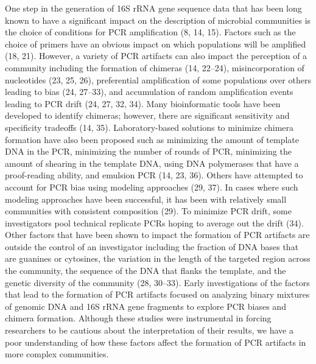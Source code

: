 \documentclass[11pt,]{article}
\begin{document}
One step in the generation of 16S rRNA gene sequence data that has been
long known to have a significant impact on the description of microbial
communities is the choice of conditions for PCR amplification (8, 14,
15). Factors such as the choice of primers have an obvious impact on
which populations will be amplified (18, 21). However, a variety of PCR
artifacts can also impact the perception of a community including the
formation of chimeras (14, 22--24), misincorporation of nucleotides (23,
25, 26), preferential amplification of some populations over others
leading to bias (24, 27--33), and accumulation of random amplification
events leading to PCR drift (24, 27, 32, 34). Many bioinformatic tools
have been developed to identify chimeras; however, there are significant
sensitivity and specificity tradeoffs (14, 35). Laboratory-based
solutions to minimize chimera formation have also been proposed such as
minimizing the amount of template DNA in the PCR, minimizing the number
of rounds of PCR, minimizing the amount of shearing in the template DNA,
using DNA polymerases that have a proof-reading ability, and emulsion
PCR (14, 23, 36). Others have attempted to account for PCR bias using
modeling approaches (29, 37). In cases where such modeling approaches
have been successful, it has been with relatively small communities with
consistent composition (29). To minimize PCR drift, some investigators
pool technical replicate PCRs hoping to average out the drift (34).
Other factors that have been shown to impact the formation of PCR
artifacts are outside the control of an investigator including the
fraction of DNA bases that are guanines or cytosines, the variation in
the length of the targeted region across the community, the sequence of
the DNA that flanks the template, and the genetic diversity of the
community (28, 30--33). Early investigations of the factors that lead to
the formation of PCR artifacts focused on analyzing binary mixtures of
genomic DNA and 16S rRNA gene fragments to explore PCR biases and
chimera formation. Although these studies were instrumental in forcing
researchers to be cautious about the interpretation of their results, we
have a poor understanding of how these factors affect the formation of
PCR artifacts in more complex communities.
\end{document}
